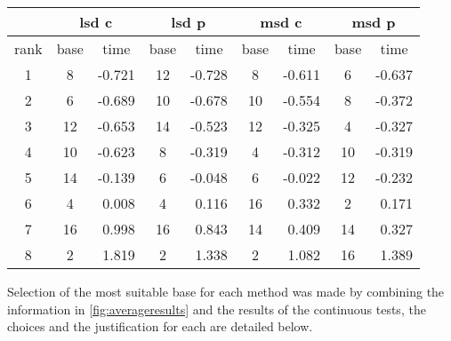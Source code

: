 \documentclass[12pt]{article}
\begin{document}
	\begin{table}[h]
		\centering
		\begin{tabular}{c|cl|cl|cl|cl}
			\toprule
			\multicolumn{1}{c}{}& \multicolumn{2}{c}{lsd c} & \multicolumn{2}{c}{lsd p} & \multicolumn{2}{c}{msd c} & \multicolumn{2}{c}{msd p} \\
			 \midrule
			 \multicolumn{1}{c}{rank} & base & \multicolumn{1}{c}{time} & base & \multicolumn{1}{c}{time} & base & \multicolumn{1}{c}{time} & base & \multicolumn{1}{c}{time} \\
			\midrule
			1 & 8 & -0.721 & 12 & -0.728 & 8 & -0.611 & 6 & -0.637 \\
			2 & 6 & -0.689 & 10 & -0.678 & 10 & -0.554 & 8 & -0.372 \\
			3 & 12 & -0.653 & 14 & -0.523 & 12 & -0.325 & 4 & -0.327 \\
			4 & 10 & -0.623 & 8 & -0.319 & 4 & -0.312 & 10 & -0.319 \\
			5 & 14 & -0.139 & 6 & -0.048 & 6 & -0.022 & 12 & -0.232 \\
			6 & 4 & \,\,0.008 & 4 & \,\,0.116 & 16 & \,\,0.332 & 2 & \,\,0.171 \\
			7 & 16 & \,\,0.998 & 16 & \,\,0.843 & 14 & \,\,0.409 & 14 & \,\,0.327 \\
			8 & 2 & \,\,1.819 & 2 & \,\,1.338 & 2 & \,\,1.082 & 16 & \,\,1.389 \\
			\bottomrule
			\end{tabular}
			\label{fig:averageresults}
		\end{table}

	Selection of the most suitable base for each method was made by combining the information in \autoref{fig:averageresults} and the results of the continuous tests, the choices and the justification for each are detailed below. 
		
\end{document}
